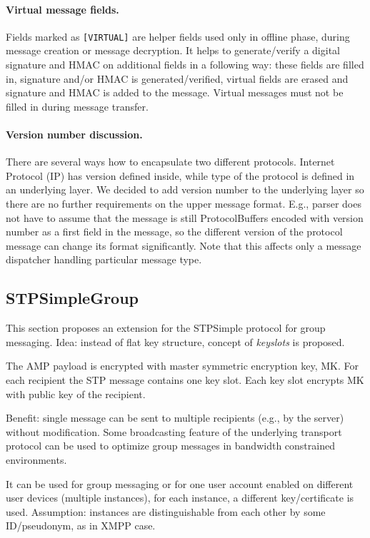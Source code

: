 \documentclass[a4paper,10pt]{article}
\begin{document}
\paragraph{Virtual message fields.} Fields marked as \verb#[VIRTUAL]# are helper fields used only in offline phase, 
during message creation or message decryption. It helps to generate/verify a digital signature and HMAC on additional fields in a following way: these 
fields are filled in, signature and/or HMAC is generated/verified, virtual fields are erased and signature and HMAC is added to the message.
Virtual messages must not be filled in during message transfer. 

\paragraph{Version number discussion.} There are several ways how to encapsulate two different protocols.
Internet Protocol (IP) has version defined inside, while type of the protocol is defined in an underlying layer.
We decided to add version number to the underlying layer so there are no further requirements on the upper message format.
E.g., parser does not have to assume that the message is still ProtocolBuffers encoded with version number as a first field
in the message, so the different version of the protocol message can change its format significantly. Note that
this affects only a message dispatcher handling particular message type.

\subsection{STPSimpleGroup}
This section proposes an extension for the STPSimple protocol for group messaging.
Idea: instead of flat key structure, concept of \emph{keyslots} is proposed.

The AMP payload is encrypted with master symmetric encryption key, MK.
For each recipient the STP message contains one key slot. Each key slot encrypts MK with 
public key of the recipient. 

Benefit: single message can be sent to multiple recipients (e.g., by the server) without modification. Some
broadcasting feature of the underlying transport protocol can be used to optimize group messages in bandwidth constrained environments.

It can be used for group messaging or for one user account enabled on different user devices (multiple instances),
for each instance, a different key/certificate is used. Assumption: instances are distinguishable from
each other by some ID/pseudonym, as in XMPP case.
\end{document}
